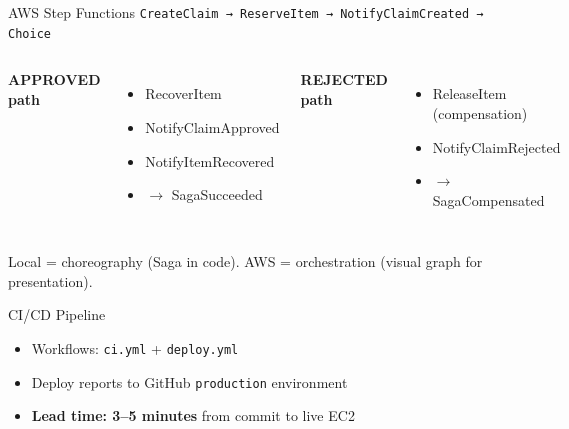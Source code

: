 \documentclass[11pt,aspectratio=169]{beamer}
\begin{document}
\begin{frame}{AWS Step Functions}
  \centering\small
  \texttt{CreateClaim → ReserveItem → NotifyClaimCreated → Choice}
  \vspace{0.2cm}
  \begin{columns}[T]
    \textbf{APPROVED path}
    \begin{itemize}
      \item RecoverItem
      \item NotifyClaimApproved
      \item NotifyItemRecovered
      \item $\rightarrow$ SagaSucceeded
    \end{itemize}
    \textbf{REJECTED path}
    \begin{itemize}
      \item ReleaseItem (compensation)
      \item NotifyClaimRejected
      \item $\rightarrow$ SagaCompensated
    \end{itemize}
  \end{columns}
  \vspace{0.3cm}
  \footnotesize Local = choreography (Saga in code). AWS = orchestration (visual graph for presentation).
\end{frame}

\begin{frame}{CI/CD Pipeline}
  \centering
  \vspace{0.5cm}
  \begin{itemize}
    \item Workflows: \texttt{ci.yml} + \texttt{deploy.yml}
    \item Deploy reports to GitHub \texttt{production} environment
    \item \textbf{Lead time: 3--5 minutes} from commit to live EC2
  \end{itemize}
\end{frame}
\end{document}
